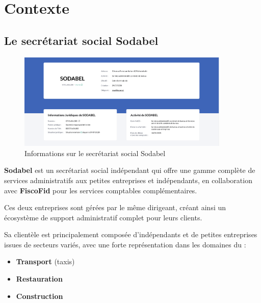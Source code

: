 \chapter{Contexte}

\section{Le secrétariat social Sodabel}

\begin{figure}[H]
    \centering
    \includegraphics[width=0.9\textwidth]{sodabelInfos.png}
    \caption{Informations sur le secrétariat social Sodabel \cite{pappers-sodabel}}
    \label{fig:sodabelInfos}
\end{figure}

\begin{tcolorbox}[
  title={\textbf{Profil de Sodabel}},
  colback=blue!5!white,
  colframe=primarycolor,
  fonttitle=\bfseries,
  boxrule=0.5mm,
  arc=2mm,
  left=6mm,
  right=6mm,
  top=6mm,
  bottom=6mm
]
\noindent\textbf{Sodabel} est un secrétariat social indépendant qui offre une gamme complète de services administratifs aux petites entreprises et indépendants, en collaboration avec \textbf{FiscoFid} pour les services comptables complémentaires. 

\noindent Ces deux entreprises sont gérées par le même dirigeant, créant ainsi un écosystème de support administratif complet pour leurs clients.

Sa clientèle est principalement composée d'indépendants et de petites entreprises issues de secteurs variés, avec une forte représentation dans les domaines du :
\begin{itemize}[leftmargin=*,label=\textcolor{darkgray}{$\bullet$},itemsep=0.3em]
  \item \textbf{Transport} (taxis)
  \item \textbf{Restauration}
  \item \textbf{Construction}
\end{itemize}
\end{tcolorbox}

